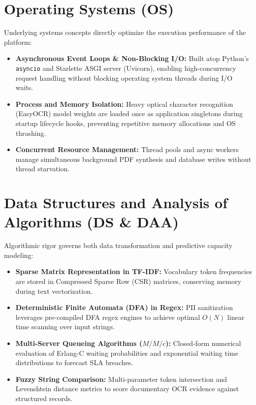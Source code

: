 \section{Operating Systems (OS)}
Underlying systems concepts directly optimize the execution performance of the platform:
\begin{itemize}
    \item \textbf{Asynchronous Event Loops \& Non-Blocking I/O:} Built atop Python's \texttt{asyncio} and Starlette ASGI server (Uvicorn), enabling high-concurrency request handling without blocking operating system threads during I/O waits.
    \item \textbf{Process and Memory Isolation:} Heavy optical character recognition (EasyOCR) model weights are loaded once as application singletons during startup lifecycle hooks, preventing repetitive memory allocations and OS thrashing.
    \item \textbf{Concurrent Resource Management:} Thread pools and async workers manage simultaneous background PDF synthesis and database writes without thread starvation.
\end{itemize}

\section{Data Structures and Analysis of Algorithms (DS \& DAA)}
Algorithmic rigor governs both data transformation and predictive capacity modeling:
\begin{itemize}
    \item \textbf{Sparse Matrix Representation in TF-IDF:} Vocabulary token frequencies are stored in Compressed Sparse Row (CSR) matrices, conserving memory during text vectorization.
    \item \textbf{Deterministic Finite Automata (DFA) in Regex:} PII sanitization leverages pre-compiled DFA regex engines to achieve optimal $O(N)$ linear time scanning over input strings.
    \item \textbf{Multi-Server Queueing Algorithms ($M/M/c$):} Closed-form numerical evaluation of Erlang-C waiting probabilities and exponential waiting time distributions to forecast SLA breaches.
    \item \textbf{Fuzzy String Comparison:} Multi-parameter token intersection and Levenshtein distance metrics to score documentary OCR evidence against structured records.
\end{itemize}

